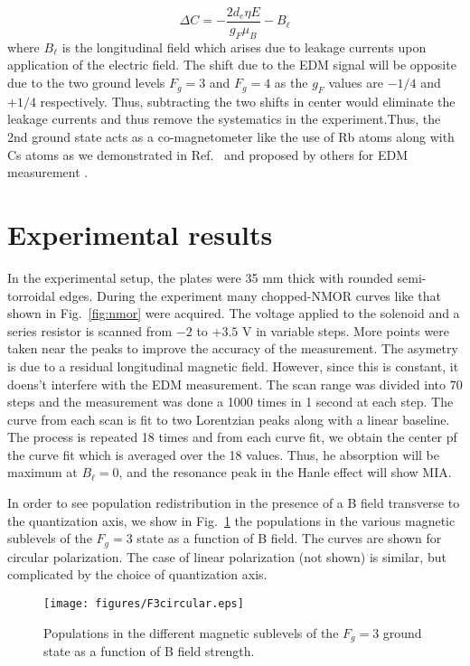 \begin{enumerate}
\begin{equation*}
\Delta C = - \dfrac{2 d_e \eta E}{g_F \mu_B} - B_\ell
\end{equation*}
where $B_\ell$ is the longitudinal field which arises due to leakage currents upon application of the electric field. The shift due to the EDM signal will be opposite due to the two ground levels $F_g=3$ and $F_g=4$ as the $ g_F $ values are $-1/4$ and $+1/4$ respectively. Thus, subtracting the two shifts in center would eliminate the leakage currents and thus remove the systematics in the experiment.Thus, the 2nd ground state acts as a co-magnetometer like the use of Rb atoms along with Cs atoms as we demonstrated in Ref.\ \cite{RCN11} and proposed by others for EDM measurement \cite{CLV01}.

\section{Experimental results}

In the experimental setup, the plates were 35 mm thick with rounded semi-torroidal edges. During the experiment many chopped-NMOR curves like that shown in Fig.\ \ref{fig:nmor} were acquired. The voltage applied to the solenoid and a series resistor  is scanned from $ -2 $ to $ +3.5 $ V in variable steps. More points were taken near the peaks to improve the accuracy of the measurement. The asymetry is due to a residual longitudinal magnetic field. However, since this is constant, it doens't interfere with the EDM measurement. The scan range was divided into 70 steps and the measurement was done a 1000 times in 1 second at each step. The curve from each scan is fit to two Lorentzian peaks along with a linear baseline. The process is repeated 18 times and from each curve fit, we obtain the center pf the curve fit which is averaged over the 18 values. Thus, 
he absorption will be maximum at $ B_{\ell} =0 $, and the resonance peak in the Hanle effect will show MIA.

In order to see population redistribution in the presence of a B field transverse to the quantization axis, we show in Fig.~\ref{fig:F3circular} the populations in the various magnetic sublevels of the $F_g = 3 $ state as a function of B field. The curves are shown for circular polarization. The case of linear polarization (not shown) is similar, but complicated by the choice of quantization axis.

\begin{figure}
	\centering
	\texttt{[image: figures/F3circular.eps]}
	\caption{Populations in the different magnetic sublevels of the $F_g = 3 $ ground state as a function of B field strength.}
	\label{fig:F3circular}
\end{figure}


\end{enumerate}
